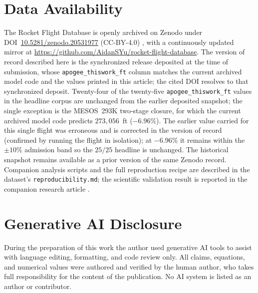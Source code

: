 \section*{Data Availability}
The Rocket Flight Database is openly archived on Zenodo under
DOI~\href{https://doi.org/10.5281/zenodo.20531977}{10.5281/zenodo.20531977}
(CC-BY-4.0) \cite{rfd_zenodo}, with a continuously updated mirror at
\url{https://github.com/AidanSYu/rocket-flight-database}. The
version of record described here is the synchronized release deposited at the
time of submission, whose \texttt{apogee\_thiswork\_ft} column matches the
current archived model code and the values printed in this article; the cited
DOI resolves to that synchronized deposit. Twenty-four of the twenty-five
\texttt{apogee\_thiswork\_ft} values in the headline corpus are unchanged from
the earlier deposited snapshot; the single exception is the MESOS~293K two-stage
closure, for which the current archived model code predicts $273{,}056$~ft
($-6.96\%$). The earlier value carried for this single flight was erroneous
and is corrected in the version of record (confirmed by running the flight in
isolation); at $-6.96\%$ it remains within the $\pm 10\%$ admission band so the
$25/25$ headline is unchanged. The historical snapshot remains available as a
prior version of the same Zenodo record.
Companion
analysis scripts and the full reproduction recipe are described in the dataset's
\texttt{reproducibility.md}; the scientific validation result is reported in the
companion research article \cite{yu2026jsr}.

\section*{Generative AI Disclosure}
During the preparation of this work the author used generative AI tools to assist
with language editing, formatting, and code review only. All claims, equations,
and numerical values were authored and verified by the human author, who takes
full responsibility for the content of the publication. No AI system is listed as
an author or contributor.
